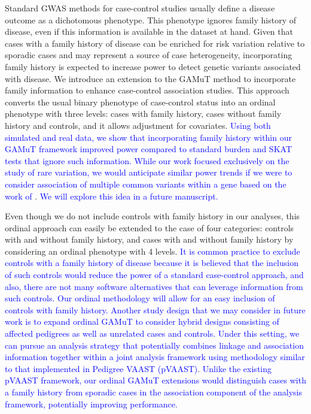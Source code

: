 \documentclass[]{article}
\begin{document}
Standard GWAS methods for case-control studies usually define a disease outcome as a dichotomous phenotype. This phenotype ignores family history of disease, even if this information is available in the dataset at hand. Given that cases with a family history of disease can be enriched for risk variation relative to sporadic cases and may represent a source of case heterogeneity, incorporating family history is expected to increase power to detect genetic variants associated with disease. We introduce an extension to the GAMuT method \citep{Broadaway2016} to incorporate family information to enhance case-control association studies. This approach converts the usual binary phenotype of case-control status into an ordinal phenotype with three levels: cases with family history, cases without family history and controls, and it allows adjustment for covariates. \textcolor{blue}{Using both simulated and real data, we show that incorporating family history within our GAMuT framework improved power compared to standard burden and SKAT tests that ignore such information. While our work focused exclusively on the study of rare variation, we would anticipate similar power trends if we were to consider association of multiple common variants within a gene based on the work of} \citet{TengRisch1999}. \textcolor{blue}{We will explore this idea in a future manuscript.}

Even though we do not include controls with family history in our analyses, this ordinal approach can easily be extended to the case of four categories: controls with and without family history, and cases with and without family history by considering an ordinal phenotype with 4 levels. \textcolor{blue}{It is common practice to exclude controls with a family history of disease because it is believed that the inclusion of such controls would reduce the power of a standard case-control approach, and also, there are not many software alternatives that can leverage information from such controls. Our ordinal methodology will allow for an easy inclusion of controls with family history. Another study design that we may consider in future work is to expand ordinal GAMuT to consider hybrid designs consisting of affected pedigrees as well as unrelated cases and controls. Under this setting, we can pursue an analysis strategy that potentially combines linkage and association information together within a joint analysis framework using methodology similar to that implemented in Pedigree VAAST (pVAAST)}\citep{Hu2014}. \textcolor{blue}{Unlike the existing pVAAST framework, our ordinal GAMuT extensions would distinguish cases with a family history from sporadic cases in the association component of the analysis framework, potentially improving performance.}
\end{document}
